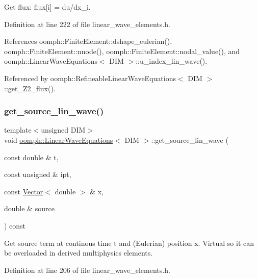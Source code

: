 Get flux\+: flux\mbox{[}i\mbox{]} = du/dx\+\_\+i. 



Definition at line 222 of file linear\+\_\+wave\+\_\+elements.\+h.



References oomph\+::\+Finite\+Element\+::dshape\+\_\+eulerian(), oomph\+::\+Finite\+Element\+::nnode(), oomph\+::\+Finite\+Element\+::nodal\+\_\+value(), and oomph\+::\+Linear\+Wave\+Equations$<$ D\+I\+M $>$\+::u\+\_\+index\+\_\+lin\+\_\+wave().



Referenced by oomph\+::\+Refineable\+Linear\+Wave\+Equations$<$ D\+I\+M $>$\+::get\+\_\+\+Z2\+\_\+flux().

\mbox{\label{classoomph_1_1LinearWaveEquations_a1f2ef4ab9b1b50c29dc64ae4491265d1}} 
\subsubsection{\texorpdfstring{get\+\_\+source\+\_\+lin\+\_\+wave()}{get\_source\_lin\_wave()}}
{\footnotesize\ttfamily template$<$unsigned D\+IM$>$ \\
void \hyperlink{classoomph_1_1LinearWaveEquations}{oomph\+::\+Linear\+Wave\+Equations}$<$ D\+IM $>$\+::get\+\_\+source\+\_\+lin\+\_\+wave (\begin{DoxyParamCaption}\item[{const double \&}]{t,  }\item[{const unsigned \&}]{ipt,  }\item[{const \hyperlink{classoomph_1_1Vector}{Vector}$<$ double $>$ \&}]{x,  }\item[{double \&}]{source }\end{DoxyParamCaption}) const\hspace{0.3cm}{\ttfamily [inline]}}



Get source term at continous time t and (Eulerian) position x. Virtual so it can be overloaded in derived multiphysics elements. 



Definition at line 206 of file linear\+\_\+wave\+\_\+elements.\+h.



